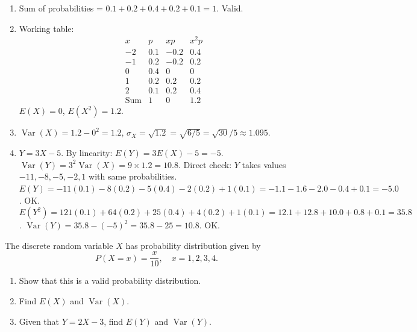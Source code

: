 \documentclass[11pt]{article}
\begin{document}
\begin{corrige}
\begin{enumerate}
\item Sum of probabilities = $0.1+0.2+0.4+0.2+0.1 = 1$. Valid.
\item Working table:
\[
\begin{array}{c|c|c|c}
x & p & xp & x^2p \\ \hline
-2 & 0.1 & -0.2 & 0.4 \\
-1 & 0.2 & -0.2 & 0.2 \\
0 & 0.4 & 0 & 0 \\
1 & 0.2 & 0.2 & 0.2 \\
2 & 0.1 & 0.2 & 0.4 \\ \hline
\text{Sum} & 1 & 0 & 1.2
\end{array}
\]
$E(X)=0$, $E(X^2)=1.2$.
\item $\operatorname{Var}(X) = 1.2 - 0^2 = 1.2$, $\sigma_X = \sqrt{1.2} = \sqrt{6/5} = \sqrt{30}/5 \approx 1.095$.
\item $Y = 3X-5$. By linearity: $E(Y) = 3E(X)-5 = -5$. $\operatorname{Var}(Y) = 3^2\operatorname{Var}(X) = 9\times1.2 = 10.8$.
Direct check: $Y$ takes values $-11, -8, -5, -2, 1$ with same probabilities.
$E(Y) = -11(0.1)-8(0.2)-5(0.4)-2(0.2)+1(0.1) = -1.1-1.6-2.0-0.4+0.1 = -5.0$. OK.
$E(Y^2) = 121(0.1)+64(0.2)+25(0.4)+4(0.2)+1(0.1) = 12.1+12.8+10.0+0.8+0.1 = 35.8$.
$\operatorname{Var}(Y) = 35.8 - (-5)^2 = 35.8 - 25 = 10.8$. OK.
\end{enumerate}
\end{corrige}

\begin{exercice}
The discrete random variable $X$ has probability distribution given by
\[
P(X=x) = \frac{x}{10}, \quad x = 1,2,3,4.
\]
\begin{enumerate}
\item Show that this is a valid probability distribution.
\item Find $E(X)$ and $\operatorname{Var}(X)$.
\item Given that $Y = 2X - 3$, find $E(Y)$ and $\operatorname{Var}(Y)$.
\end{enumerate}
\end{exercice}
\end{document}
